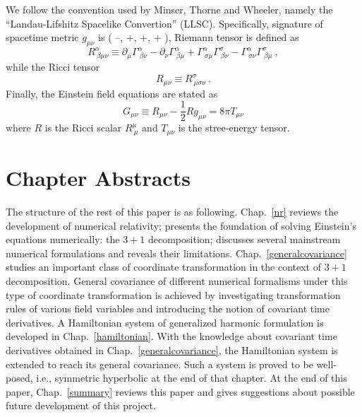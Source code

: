 We follow the convention used by Minser, Thorne and Wheeler\cite{Misner:1974qy}, namely the ``Landau-Lifshitz Spacelike Convertion'' (LLSC). Specifically, signature of spacetime metric $g_{\mu\nu}$ is ( --, +, +, + ), Riemann tensor is defined as 
\begin{equation}
	R^{\alpha}_{~\beta \mu \nu} \equiv 
	\partial_{\mu}\Gamma^{\alpha}_{~\beta \nu} - 
	\partial_{\nu}\Gamma^{\alpha}_{~\beta \mu} + \Gamma^{\alpha}_{~\sigma \mu}\Gamma^{\sigma}_{~\beta \nu} - \Gamma^{\alpha}_{~\sigma \nu}\Gamma^{\sigma}_{~\beta\mu} \ , 
\end{equation}
while the Ricci tensor 
\begin{equation}
	R_{\mu\nu} \equiv R^{\sigma}_{~\mu\sigma\nu} \ . 
\end{equation}
Finally, the Einstein field equations are stated as 
\begin{equation}
	G_{\mu\nu} \equiv R_{\mu\nu} - \frac{1}{2} R g_{\mu\nu} = 8\pi T_{\mu\nu} 
\end{equation}
where $R$ is the Ricci scalar $R^{\mu}_{~\mu}$ and $T_{\mu\nu}$ is the stree-energy tensor. 

\section{Chapter Abstracts}\label{abstracts}
The structure of the rest of this paper is as following. Chap.~\ref{nr} reviews the development of numerical relativity; presents the foundation of solving Einstein's equations numerically: the $3 + 1$ decomposition; discusses several mainstream numerical formulations and reveals their limitations. Chap.~\ref{generalcovariance} studies an important class of coordinate transformation in the context of $3 + 1$ decomposition. General covariance of different numerical formalisms under this type of coordinate transformation is achieved by investigating transformation rules of various field variables and introducing the notion of covariant time derivatives. A Hamiltonian system of generalized harmonic formulation is developed in Chap.~\ref{hamiltonian}. With the knowledge about covariant time derivatives obtained in Chap.~\ref{generalcovariance}, the Hamiltonian system is extended to reach its general covariance. Such a system is proved to be well-posed, i.e., symmetric hyperbolic at the end of that chapter. At the end of this paper, Chap.~\ref{summary} reviews this paper and gives suggestions about possible future development of this project. 
